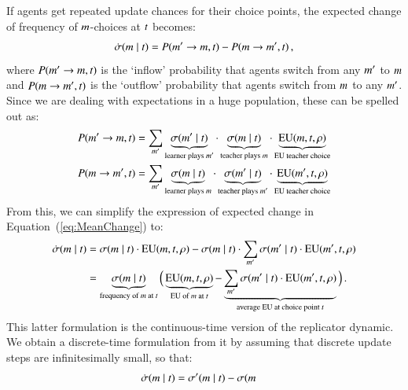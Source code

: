 \documentclass[11pt,english]{article}
\numberwithin{equation}{section}
\begin{document}
\begin{appendices}
If agents get repeated update chances for their choice points, the expected change of
frequency of $m$-choices at $t$ becomes:
\begin{align}
  \label{eq:MeanChange}
  \dot{\sigma}(m \mid t) = P(m' \rightarrow m, t) - P(m \rightarrow m', t)\,,
\end{align}
where $P(m' \rightarrow m, t)$ is the `inflow' probability that agents switch from
any $m'$ to $m$ and $P(m \rightarrow m', t)$ is the `outflow' probability
that agents switch from $m$ to any $m'$. Since we are dealing with expectations in a
huge population, these can be spelled out as:
\begin{align*}
  P(m' \rightarrow m, t) & = \sum_{m'} \underbrace{\sigma(m' \mid
    t)}_{\text{learner plays $m'$}} \cdot
  \underbrace{\sigma(m \mid t)}_{\text{teacher plays $m$}} \cdot
  \underbrace{\mathrm{EU}(m, t, \rho)}_{\text{EU teacher choice}} \\
  P(m \rightarrow m', t) & = \sum_{m'} \underbrace{\sigma(m \mid
    t)}_{\text{learner plays $m$}} \cdot
  \underbrace{\sigma(m' \mid t)}_{\text{teacher plays $m'$}} \cdot
  \underbrace{\mathrm{EU}(m', t, \rho)}_{\text{EU teacher choice}}
\end{align*}
From this, we can simplify the expression of expected change in Equation~(\ref{eq:MeanChange})
to:
\begin{align*}
  \dot{\sigma}(m \mid t) & = \sigma(m \mid t) \cdot \mathrm{EU}(m,
  t, \rho) - \sigma(m \mid t) \cdot  \sum_{m'}
      \sigma(m' \mid t) \cdot \mathrm{EU}(m',t,\rho) \\
& = \underbrace{\sigma(m \mid
    t)}_{\text{frequency of $m$ at $t$}}  \Big ( \underbrace{\mathrm{EU}(m,
  t, \rho)}_{\text{EU of $m$ at $t$}} -   \underbrace{\sum_{m'}
      \sigma(m' \mid t) \cdot \mathrm{EU}(m',t,\rho)}_{\text{average
      EU at choice point $t$}} \Big )\,.
\end{align*}
This latter formulation is the continuous-time version of the replicator dynamic. We obtain a
discrete-time formulation from it by assuming that discrete update steps are infinitesimally
small, so that:
 \begin{align*}
    \dot{\sigma}(\messg \probbar \state) & = \sigma'(\messg \probbar \state) - \sigma(\messg

\end{align*}
\end{appendices}
\end{document}
